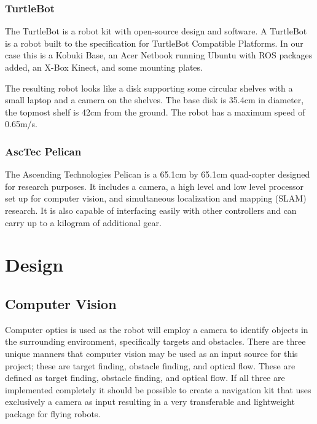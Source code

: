 \documentclass{article}
\begin{document}
		\subsubsection{TurtleBot}
		
		The TurtleBot is a robot kit with open-source design and software. A TurtleBot is a robot built to the specification for TurtleBot Compatible Platforms\cite{wise_foote_2011}. In our case this is a Kobuki Base, an Acer Netbook running Ubuntu with ROS packages added, an X-Box Kinect, and some mounting plates. 
		
		The resulting robot looks like a disk supporting some circular shelves with a small laptop and a camera on the shelves. The base disk is 35.4cm in diameter, the topmost shelf is 42cm from the ground. The robot has a maximum speed of 0.65m/s. 
		
		\subsubsection{AscTec Pelican}
		
		The Ascending Technologies Pelican is a 65.1cm by 65.1cm quad-copter designed for research purposes\cite{asctec}. It includes a camera, a high level and low level processor set up for computer vision, and simultaneous localization and mapping (SLAM) research. It is also capable of interfacing easily with other controllers and can carry up to a kilogram of additional gear.
		
\section{Design}
	
	\subsection{Computer Vision}
	
	Computer optics is used as the robot will employ a camera to identify objects in the surrounding environment, specifically targets and obstacles. There are three unique manners that computer vision may be used as an input source for this project; these are target finding, obstacle finding, and optical flow. These are defined as target finding, obstacle finding, and optical flow. If all three are implemented completely it should be possible to create a navigation kit that uses exclusively a camera as input resulting in a very transferable and lightweight package for flying robots.
	
\end{document}

